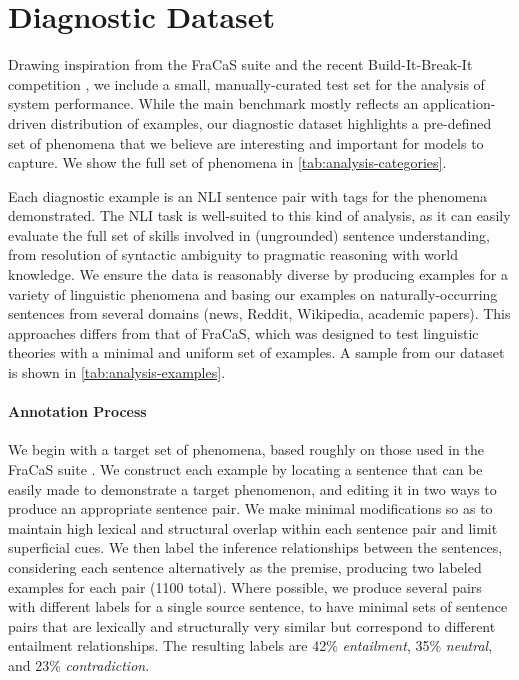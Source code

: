 \documentclass{article} \usepackage{iclr2019_conference,times}
\begin{document}
\section{Diagnostic Dataset}

Drawing inspiration from the FraCaS suite \citep{cooper96fracas} and the recent Build-It-Break-It competition \citep{ettinger2017towards}, we include a small, manually-curated test set for the analysis of system performance. While the main benchmark mostly reflects an application-driven distribution of examples, 
our diagnostic dataset highlights a pre-defined set of phenomena that we believe are interesting and important for models to capture. We show the full set of phenomena in \autoref{tab:analysis-categories}.

Each diagnostic example is an NLI sentence pair with tags for the phenomena demonstrated.
The NLI task is well-suited to this kind of analysis, as it can easily evaluate the full set of skills involved in (ungrounded) sentence understanding, from resolution of syntactic ambiguity to pragmatic reasoning with world knowledge.
We ensure the data is reasonably diverse by producing examples for a variety of linguistic phenomena and basing our examples on naturally-occurring sentences from several domains (news, Reddit, Wikipedia, academic papers).
This approaches differs from that of FraCaS, which was designed to test linguistic theories with a minimal and uniform set of examples.
A sample from our dataset is shown in \autoref{tab:analysis-examples}. 






\paragraph{Annotation Process} 
We begin with a target set of phenomena, based roughly on those used in the FraCaS suite \citep{cooper96fracas}.
We construct each example by locating a sentence that can be easily made to demonstrate a target phenomenon, and editing it in two ways to produce an appropriate sentence pair.
We make minimal modifications so as to maintain high lexical and structural overlap within each sentence pair and limit superficial cues.
We then label the inference relationships  between the sentences, considering each sentence alternatively as the premise, producing two labeled examples for each pair (1100 total).
Where possible, we produce several pairs with different labels for a single source sentence, to have minimal sets of sentence pairs that are lexically and structurally very similar but correspond to different entailment relationships.
The resulting labels are 42\% \textit{entailment}, 35\% \textit{neutral}, and 23\% \textit{contradiction}.
\end{document}
